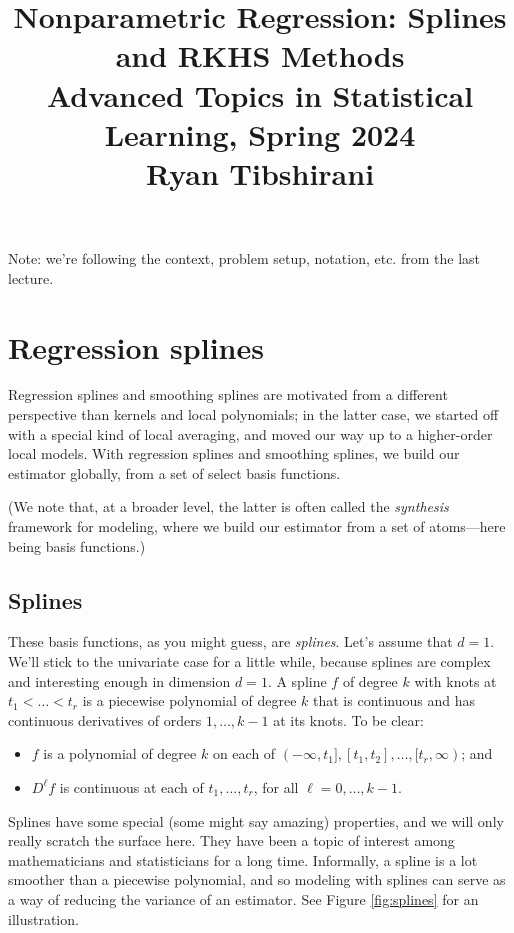 \documentclass{article}
\title{Nonparametric Regression: Splines and RKHS Methods \\ \smallskip
\large Advanced Topics in Statistical Learning, Spring 2024 \\ \smallskip
Ryan Tibshirani}
\author{}
\date{}
\begin{document}
\maketitle
\RaggedRight
\vspace{-50pt}

Note: we're following the context, problem setup, notation, etc. from the last
lecture.

\section{Regression splines}

Regression splines and smoothing splines are motivated from a different
perspective than kernels and local polynomials; in the latter case, we started
off with a special kind of local averaging, and moved our way up to a
higher-order local models. With regression splines and smoothing splines, we
build our estimator globally, from a set of select basis functions. 

(We note that, at a broader level, the latter is often called the
\emph{synthesis} framework for modeling, where we build our estimator from a  
set of atoms---here being basis functions.) 

\subsection{Splines}

These basis functions, as you might guess, are \emph{splines}. Let's assume that
$d=1$. We'll stick to the univariate case for a little while, because splines
are complex and interesting enough in dimension $d=1$. A spline $f$ of degree
$k$ with knots at $t_1 < \dots < t_r$ is a piecewise polynomial of degree $k$  
that is continuous and has continuous derivatives of orders $1,\dots,k-1$ at its
knots. To be clear: 
\begin{itemize}
\item $f$ is a polynomial of degree $k$ on each of $(-\infty,t_1], [t_1,t_2],
  \dots, [t_r,\infty)$; and
\item $D^\ell f$ is continuous at each of $t_1,\dots,t_r$, for all
  $\ell=0,\dots,k-1$. 
\end{itemize}

Splines have some special (some might say amazing) properties, and we will only
really scratch the surface here. They have been a topic of interest among
mathematicians and statisticians for a long time. Informally, a spline is a lot
smoother than a piecewise polynomial, and so modeling with splines can serve as
a way of reducing the variance of an estimator. See Figure \ref{fig:splines} for
an illustration.  
\end{document}

